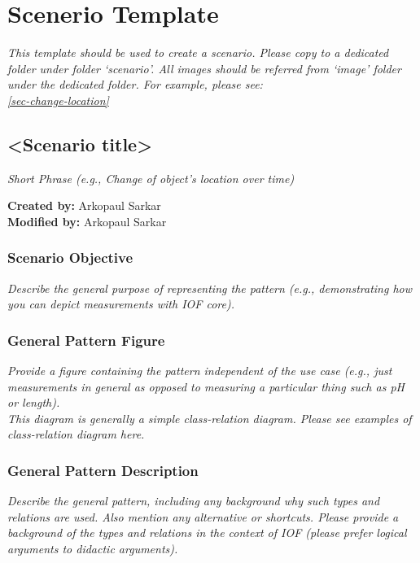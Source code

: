 \chapter{Scenerio Template}
\label{chapter-scenario-template}
\textit{This template should be used to create a scenario. Please copy to a dedicated folder under folder `scenario'. All images should be referred from `image' folder under the dedicated folder. For example, please see: \\
\cref{sec-change-location}}

\section*{<Scenario title>}

\textit{Short Phrase (e.g., Change of object's location over time)}

\textbf{Created by:} Arkopaul Sarkar \\
\textbf{Modified by:} Arkopaul Sarkar \\

\subsection*{Scenario Objective}
\textit{ 
Describe the general purpose of representing the pattern (e.g., demonstrating how you can depict measurements with IOF core).}


\subsection*{General Pattern Figure}
\textit{  
Provide a figure containing the pattern independent of the use case (e.g., just measurements in general as opposed to measuring a particular thing such as pH or length). \\
\noindent \textit{This diagram is generally a simple class-relation diagram. Please see examples of class-relation diagram here.}
  }


\subsection*{General Pattern Description}
\textit{ 
Describe the general pattern, including any background why such types and relations are used. Also mention any alternative or shortcuts. Please provide a background of the types and relations in the context of IOF (please prefer logical arguments to didactic arguments).
}


